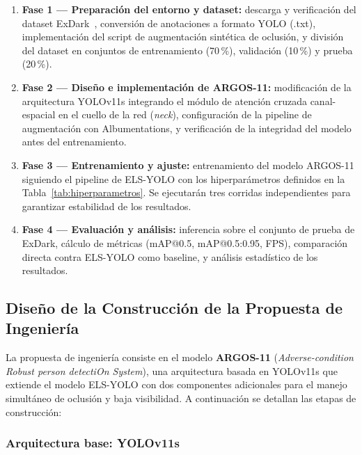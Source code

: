 \begin{enumerate}
  \item \textbf{Fase 1 --- Preparaci\'on del entorno y dataset:}
        descarga y verificaci\'on del dataset ExDark~\cite{Loh2019},
        conversi\'on de anotaciones a formato YOLO (.txt),
        implementaci\'on del script de augmentaci\'on sint\'etica
        de oclusi\'on, y divisi\'on del dataset en conjuntos de
        entrenamiento (70\,\%), validaci\'on (10\,\%) y prueba
        (20\,\%).

  \item \textbf{Fase 2 --- Dise\~{n}o e implementaci\'on de
        ARGOS-11:} modificaci\'on de la arquitectura YOLOv11s
        integrando el m\'odulo de atenci\'on cruzada canal-espacial
        en el cuello de la red (\textit{neck}), configuraci\'on de
        la pipeline de augmentaci\'on con Albumentations, y
        verificaci\'on de la integridad del modelo antes del
        entrenamiento.

  \item \textbf{Fase 3 --- Entrenamiento y ajuste:} entrenamiento
        del modelo ARGOS-11 siguiendo el pipeline de ELS-YOLO con
        los hiperpar\'ametros definidos en la
        Tabla~\ref{tab:hiperparametros}. Se ejecutar\'an tres
        corridas independientes para garantizar estabilidad de los
        resultados.

  \item \textbf{Fase 4 --- Evaluaci\'on y an\'alisis:} inferencia
        sobre el conjunto de prueba de ExDark, c\'alculo de m\'etricas
        (mAP@0.5, mAP@0.5:0.95, FPS), comparaci\'on directa contra
        ELS-YOLO como baseline, y an\'alisis estad\'{i}stico de los
        resultados.
\end{enumerate}

\subsection{Dise\~{n}o de la Construcci\'on de la Propuesta de
Ingenier\'ia}

La propuesta de ingenier\'ia consiste en el modelo \textbf{ARGOS-11}
(\textit{Adverse-condition Robust person detectiOn System}), una
arquitectura basada en YOLOv11s que extiende el modelo ELS-YOLO
con dos componentes adicionales para el manejo simult\'aneo de
oclusi\'on y baja visibilidad. A continuaci\'on se detallan las
etapas de construcci\'on:

\subsubsection{Arquitectura base: YOLOv11s}

